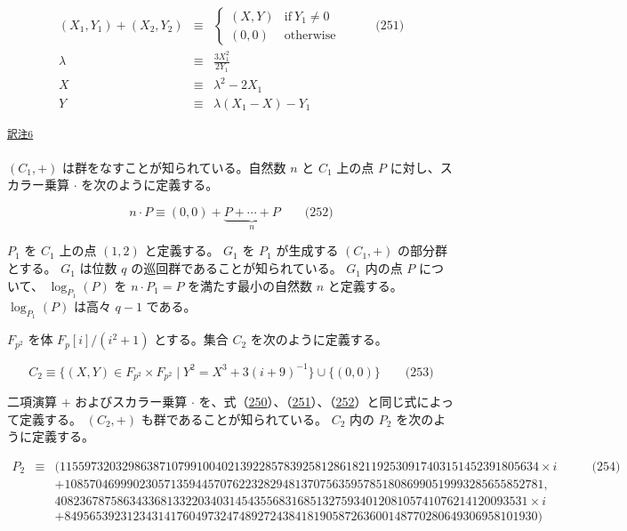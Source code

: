 \documentclass[
]{ltjsarticle}
\begin{document}
\protect\hypertarget{eq-251}{}{}\protect\hypertarget{eq:ec-doubling}{}{}

\[\begin{aligned}
(X_1, Y_1) + (X_2, Y_2)&\equiv&\begin{cases}
(X,Y)&\text{if}\ Y_1\neq 0\\
(0,0)&\text{otherwise}
\end{cases} & \qquad \text{(251)} \\
\lambda&\equiv&\frac{3X_1^2}{2Y_1} \\
X&\equiv&\lambda^2-2X_1 \\
Y&\equiv&\lambda(X_1-X)-Y_1
\end{aligned}\]

\protect\hypertarget{tnref-6}{}{}\textsuperscript{\protect\hyperlink{tn-6}{訳注6}}

\((C_1,+)\) は群をなすことが知られている。自然数 \(n\) と \(C_1\) 上の点
\(P\) に対し、スカラー乗算 \(\cdot\) を次のように定義する。

\protect\hypertarget{eq-252}{}{}\protect\hypertarget{eq:ec-scalar-multiplication}{}{}

\[n\cdot P\equiv(0,0)+\underbrace{P+\cdots+P}_{n} \qquad \text{(252)}\]

\(P_1\) を \(C_1\) 上の点 \((1,2)\) と定義する。 \(G_1\) を \(P_1\)
が生成する \((C_1,+)\) の部分群とする。 \(G_1\) は位数 \(q\)
の巡回群であることが知られている。 \(G_1\) 内の点 \(P\) について、
\(\log_{P_1}(P)\) を \(n\cdot P_1=P\) を満たす最小の自然数 \(n\)
と定義する。 \(\log_{P_1}(P)\) は高々 \(q-1\) である。

\(F_{p^2}\) を体 \(F_{p}[i]/(i^2+1)\) とする。集合 \(C_2\)
を次のように定義する。

\protect\hypertarget{eq-253}{}{}

\[C_2\equiv\{(X,Y)\in F_{p^2}\times F_{p^2}\mid Y^2=X^3+3(i+9)^{-1}\}\cup\{(0,0)\} \qquad \text{(253)}\]

二項演算 \(+\) およびスカラー乗算 \(\cdot\)
を、式（\protect\hyperlink{eq:ec-addition}{250}）、（\protect\hyperlink{eq:ec-doubling}{251}）、（\protect\hyperlink{eq:ec-scalar-multiplication}{252}）と同じ式によって定義する。
\((C_2,+)\) も群であることが知られている。 \(C_2\) 内の \(P_2\)
を次のように定義する。

\protect\hypertarget{eq-254}{}{}

\[\begin{aligned}
P_2&\equiv&
(11559732032986387107991004021392285783925812861821192530917403151452391805634 \times i & \qquad \text{(254)} \\
&&+ 10857046999023057135944570762232829481370756359578518086990519993285655852781, \\
&& 4082367875863433681332203403145435568316851327593401208105741076214120093531 \times i \\
&&+ 8495653923123431417604973247489272438418190587263600148770280649306958101930)
\end{aligned}\]
\end{document}
